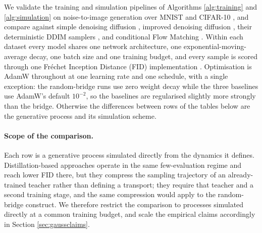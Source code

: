 
We validate the training and simulation pipelines of Algorithms \ref{alg:training}
and \ref{alg:simulation} on noise-to-image generation over MNIST \cite{18} and
CIFAR-10 \cite{cifar2009}, and compare against simple denoising diffusion
\cite{12}, improved denoising diffusion \cite{13a}, their deterministic DDIM
samplers \cite{13b}, and conditional Flow Matching \cite{27}. Within each dataset every
model shares one network architecture, one exponential-moving-average decay, one
batch size and one training budget, and every sample is scored through one
Fr\'echet Inception Distance (FID) implementation \cite{fid2017}. Optimisation is
AdamW throughout at one learning rate and one schedule, with a single exception:
the random-bridge runs use zero weight decay while the three baselines use
AdamW's default $10^{-2}$, so the baselines are regularised slightly more
strongly than the bridge. Otherwise the differences between rows of the tables
below are the generative process and its simulation scheme.

\paragraph{Scope of the comparison.} Each row is a generative process simulated
directly from the dynamics it defines. Distillation-based approaches
\cite{19,21,22} operate in the same few-evaluation regime and reach lower FID
there, but they compress the sampling trajectory of an already-trained teacher
rather than defining a transport; they require that teacher and a second
training stage, and the same compression would apply to the random-bridge
construct. We therefore restrict the comparison to processes simulated directly
at a common training budget, and scale the empirical claims accordingly in
Section \ref{sec:gaussclaims}.

